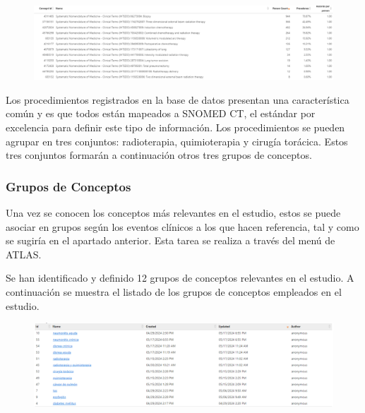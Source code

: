 \begin{figure}[H]
    \centering
    \includegraphics[width=1\textwidth]{tables/procedureREPORT.png}
    \label{table:procedureREPORT}
\end{figure}

Los procedimientos registrados en la base de datos presentan una característica común y es que todos están mapeados a SNOMED CT, el estándar por excelencia para definir este tipo de información. Los procedimientos se pueden agrupar en tres conjuntos: radioterapia, quimioterapia y cirugía torácica. Estos tres conjuntos formarán a continuación otros tres grupos de conceptos.

\subsubsection{Grupos de Conceptos}

Una vez se conocen los conceptos más relevantes en el estudio, estos se puede asociar en grupos según los eventos clínicos a los que hacen referencia, tal y como se sugiría en el apartado anterior. Esta tarea se realiza a través del menú  de ATLAS.

Se han identificado y definido 12 grupos de conceptos relevantes en el estudio. A continuación se muestra el listado de los grupos de conceptos empleados en el estudio.

\begin{figure}[H]
    \centering
    \includegraphics[width=1\textwidth]{tables/conceptSetLIST.png}
    \label{table:conceptSetLIST}
\end{figure}

